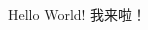 \documentclass{article}
\begin{document}
\begin{CJK*}{UTF8}{gbsn}

Hello World! 我来啦！%

\clearpage\end{CJK*}
\end{document}
